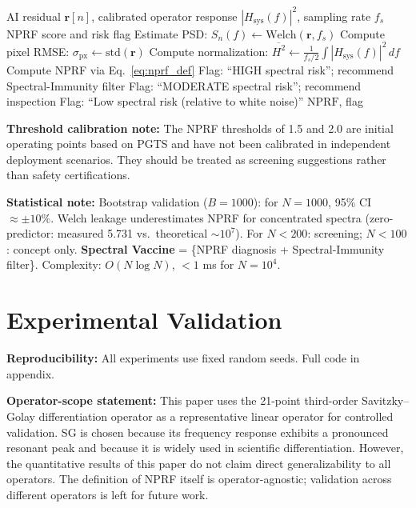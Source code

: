 \documentclass[9pt,twocolumn]{article}
\theoremstyle{remark}
\theoremstyle{definition}
\newcommand{\pxrmse}{\sigma_{\text{px}}}
\newcommand{\nprf}{\text{NPRF}}
\newcommand{\snf}{S_n(f)}
\newcommand{\hsysf}{|H_{\text{sys}}(f)|^2}
\newcommand{\Hsqmean}{\overline{H^2}}
\newcommand{\algorithmiccompact}{\renewcommand{\algorithmicrequire}{\textbf{Input:}}\renewcommand{\algorithmicensure}{\textbf{Output:}}}
\begin{document}
\begin{algorithm}[htbp]
\scriptsize
\algorithmiccompact
\begin{algorithmic}[1]
\Require AI residual $\mathbf{r}[n]$, calibrated operator response $\hsysf$, sampling rate $f_s$
\Ensure NPRF score and risk flag
\State Estimate PSD: $\snf \leftarrow \text{Welch}(\mathbf{r}, f_s)$ 
\State Compute pixel RMSE: $\pxrmse \leftarrow \text{std}(\mathbf{r})$
\State Compute normalization: $\Hsqmean \leftarrow \frac{1}{f_s/2}\int \hsysf \, df$
\State Compute NPRF via Eq.~\eqref{eq:nprf_def}
\If{$\nprf > 2.0$}
    \State Flag: ``HIGH spectral risk''; recommend Spectral-Immunity filter
\ElsIf{$\nprf > 1.5$}
    \State Flag: ``MODERATE spectral risk''; recommend inspection
\Else
    \State Flag: ``Low spectral risk (relative to white noise)''
\EndIf
\State \Return $\nprf$, flag
\end{algorithmic}
\caption{Spectral Immunity Check (deployment-ready)}
\label{alg:nprf}
\end{algorithm}

\textbf{Threshold calibration note:} The NPRF thresholds of 1.5 and 2.0 are initial operating points based on PGTS and have not been calibrated in independent deployment scenarios. They should be treated as screening suggestions rather than safety certifications.

\textbf{Statistical note:} Bootstrap validation ($B=1000$): for $N=1000$, 95\% CI $\approx\pm10\%$. Welch leakage underestimates NPRF for concentrated spectra (zero-predictor: measured 5.731 vs.\ theoretical $\sim10^7$). For $N<200$: screening; $N<100$: concept only. \textbf{Spectral Vaccine} = \{NPRF diagnosis + Spectral-Immunity filter\}. Complexity: $O(N\log N)$, $<1$ ms for $N=10^4$.

\section{Experimental Validation}

\begingroup
\scriptsize
\textbf{Reproducibility:} All experiments use fixed random seeds. Full code in appendix.

\textbf{Operator-scope statement:} This paper uses the 21-point third-order Savitzky--Golay differentiation operator as a representative linear operator for controlled validation. SG is chosen because its frequency response exhibits a pronounced resonant peak and because it is widely used in scientific differentiation. However, the quantitative results of this paper do not claim direct generalizability to all operators. The definition of NPRF itself is operator-agnostic; validation across different operators is left for future work.
\endgroup
\end{document}
